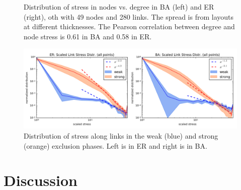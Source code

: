 \documentclass[nofootinbib,preprint,floatfix,titlepage,endfloats]{revtex4} %
\begin{document}
{\begin{figure}
    \caption{Distribution of stress in nodes vs. degree in BA (left) and ER (right), oth with 49 nodes and 280 links. The spread is from layouts at different thicknesses. The Pearson correlation between degree and node stress is 0.61 in BA and 0.58 in ER.}
    \label{fig:stress-k}
\end{figure}
\begin{figure}
    \centering
    \includegraphics[width=.8\columnwidth]{fig-09-19/stress-dist.png}
    \caption{Distribution of stress along links in the weak (blue) and strong (orange) exclusion phases. Left is in ER and right is in BA. }
    \label{fig:Tdist}
\end{figure}
} %



\section*{Discussion}
\end{document}
